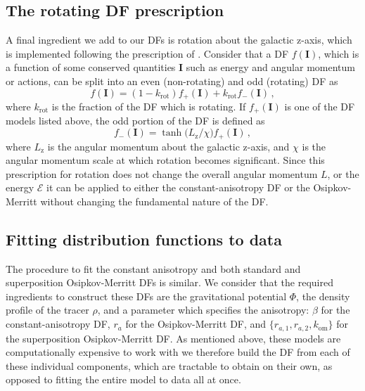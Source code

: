 \subsection{The rotating DF prescription}
\label{ch4:subsec:rotating-df-prescription}

A final ingredient we add to our DFs is rotation about the galactic z-axis, which is implemented following the prescription of \textcite{binney14d} \parencite[see also][for an equivalent implementation using constant-anisotropy DFs]{deason11}. Consider that a DF $f(\mathbf{I})$, which is a function of some conserved quantities $\mathbf{I}$ such as energy and angular momentum or actions, can be split into an even (non-rotating) and odd (rotating) DF as 
\begin{equation}
    \label{ch4:eq:even-odd-df}
    f(\mathbf{I}) = (1-k_\mathrm{rot})f_{+}(\mathbf{I}) + k_\mathrm{rot}f_{-}(\mathbf{I})\,,
\end{equation}
\noindent where $k_\mathrm{rot}$ is the fraction of the DF which is rotating. If $f_{+}(\mathbf{I})$ is one of the DF models listed above, the odd portion of the DF is defined as
\begin{equation}
    \label{ch4:eq:rotating-df-kernel}
    f_{-}(\mathbf{I}) = \tanh \big( L_{\mathrm{z}}/\chi \big) f_{+}(\mathbf{I})\,,
\end{equation}
\noindent where $L_{\mathrm{z}}$ is the angular momentum about the galactic z-axis, and $\chi$ is the angular momentum scale at which rotation becomes significant. Since this prescription for rotation does not change the overall angular momentum $L$, or the energy $\mathcal{E}$ it can be applied to either the constant-anisotropy DF or the Osipkov-Merritt without changing the fundamental nature of the DF.

\subsection{Fitting distribution functions to data}
\label{ch4:subsec:fitting-constant-anisotropy-osipkov-merritt-dfs}

The procedure to fit the constant anisotropy and both standard and superposition Osipkov-Merritt DFs is similar. We consider that the required ingredients to construct these DFs are the gravitational potential $\Phi$, the density profile of the tracer $\rho$, and a parameter which specifies the anisotropy: $\beta$ for the constant-anisotropy DF, $r_{a}$ for the Osipkov-Merritt DF, and $\{ r_{a,1},r_{a,2},k_\mathrm{om} \}$ for the superposition Osipkov-Merritt DF. As mentioned above, these models are computationally expensive to work with we therefore build the DF from each of these individual components, which are tractable to obtain on their own, as opposed to fitting the entire model to data all at once. 

